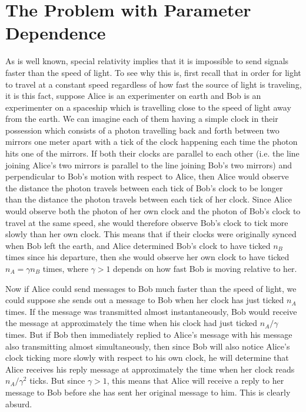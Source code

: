\section{The Problem with Parameter Dependence}\label{PDProb}
As is well known, special relativity implies that it is impossible to send signals faster than the speed of light. To see why this is, first recall that in order for light to travel at a constant speed regardless of how fast the source of light is traveling, it is 
\newpage \noindent
this fact, suppose Alice is an experimenter on earth and Bob is an experimenter on a spaceship which is travelling close to the speed of light away from the earth. We can imagine each of them having a simple clock in their possession which consists of a photon travelling back and forth between two mirrors one meter apart with a tick of the clock happening each time the photon hits one of the mirrors.  If both their clocks are parallel to each other (i.e. the line joining Alice's two mirrors is parallel to the line joining Bob's two mirrors) and perpendicular to Bob's motion with respect to Alice, then Alice would observe the distance the photon travels between each tick of Bob's clock to be longer than the distance the photon travels between each tick of her clock. Since Alice would observe both the photon of her own clock and the photon of Bob's clock to travel at the same speed, she would therefore observe Bob's clock to tick more slowly than her own clock. This means that if their clocks were originally synced when Bob left the earth, and Alice determined Bob's clock to have ticked $n_B$ times since his departure, then she would observe her own clock to have ticked $n_A=\gamma n_B$ times, where $\gamma >1$ depends on how fast Bob is moving relative to her.  

Now if Alice could send messages to Bob much faster than the speed of light, we could suppose she sends out a message to Bob when her clock has just ticked $n_A$ times. If the message was transmitted almost instantaneously, Bob would  receive the message at approximately the time when his clock had just ticked $n_A/\gamma$ times. 
But if Bob then immediately replied to Alice's message with his message also transmitting almost simultaneously, then since Bob will also notice Alice's clock ticking more slowly with respect to his own clock, he will determine that Alice receives his reply message at approximately the time when her clock reads $n_A/\gamma^2$ ticks. But since $\gamma>1$, this means that Alice will receive a reply to her message to Bob before she has sent her original message to him. This is clearly absurd. 

